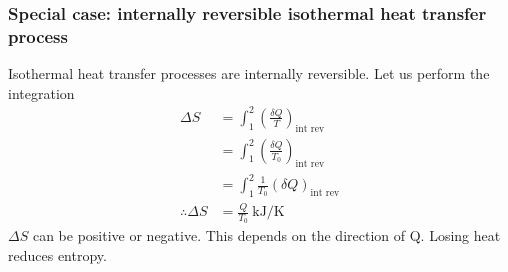 \subsubsection{Special case: internally reversible isothermal heat transfer process}
Isothermal heat transfer processes are internally reversible. Let us perform the integration
\begin{align}
  \Delta S            & = \int_1^2 \left(\frac{\delta Q}{T}\right)_{\textrm{int rev}}    \\
                      & = \int_1^2 \left(\frac{\delta Q}{T_0}\right)_{\textrm{int rev}}  \\
                      & = \int_1^2 \frac{1}{T_0}\left(\delta Q\right)_{\textrm{int rev}} \\
  \therefore \Delta S & = \frac{Q}{T_0} \ \si{\kilo\joule\per\kelvin} \label{clausius4}
\end{align}
\(\Delta S\) can be positive or negative. This depends on the direction of Q. Losing heat reduces entropy.
